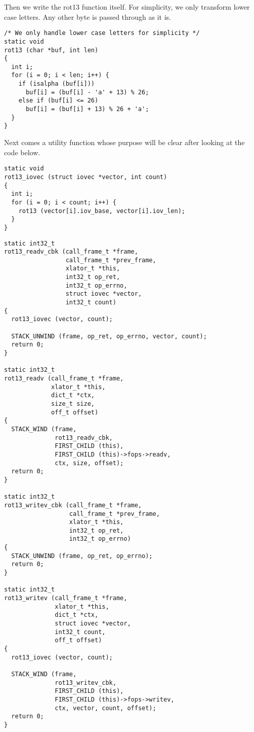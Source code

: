 \documentclass{book}[12pt]
\begin{document}
Then we write the rot13 function itself. For simplicity, we only transform lower case
letters. Any other byte is passed through as it is.

\begin{verbatim}
/* We only handle lower case letters for simplicity */
static void
rot13 (char *buf, int len)
{
  int i;
  for (i = 0; i < len; i++) {
    if (isalpha (buf[i]))
      buf[i] = (buf[i] - 'a' + 13) % 26;
    else if (buf[i] <= 26)
      buf[i] = (buf[i] + 13) % 26 + 'a';
  }
}
\end{verbatim}

Next comes a utility function whose purpose will be clear after looking at the code
below.

\begin{verbatim}
static void
rot13_iovec (struct iovec *vector, int count)
{
  int i;
  for (i = 0; i < count; i++) {
    rot13 (vector[i].iov_base, vector[i].iov_len);
  }
}
\end{verbatim}

\begin{verbatim}
static int32_t
rot13_readv_cbk (call_frame_t *frame,
                 call_frame_t *prev_frame,
                 xlator_t *this,
                 int32_t op_ret,
                 int32_t op_errno,
                 struct iovec *vector,
                 int32_t count)
{
  rot13_iovec (vector, count);

  STACK_UNWIND (frame, op_ret, op_errno, vector, count);
  return 0;
}

static int32_t
rot13_readv (call_frame_t *frame,
             xlator_t *this,
             dict_t *ctx,
             size_t size,
             off_t offset)
{
  STACK_WIND (frame,
              rot13_readv_cbk,
              FIRST_CHILD (this),
              FIRST_CHILD (this)->fops->readv,
              ctx, size, offset);
  return 0;
}

static int32_t
rot13_writev_cbk (call_frame_t *frame,
                  call_frame_t *prev_frame,
                  xlator_t *this,
                  int32_t op_ret,
                  int32_t op_errno)
{
  STACK_UNWIND (frame, op_ret, op_errno);
  return 0;
}

static int32_t
rot13_writev (call_frame_t *frame,
              xlator_t *this,
              dict_t *ctx,
              struct iovec *vector,
              int32_t count,
              off_t offset)
{
  rot13_iovec (vector, count);

  STACK_WIND (frame,
              rot13_writev_cbk,
              FIRST_CHILD (this),
              FIRST_CHILD (this)->fops->writev,
              ctx, vector, count, offset);
  return 0;
}

\end{verbatim}
\end{document}

